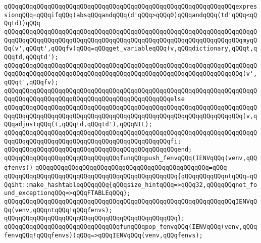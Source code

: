 \newline
\verb|qQQqqQQqqQQqqQQqqQQqqQQqqQQqqQQqqQQqqQQqqQQqqQQqqQQqqQQqqQQqqQQqexpressionqQQq=qQQqifqQQq(absqQQqandqQQq(d'qQQq>qQQq0)qQQqandqQQq(td'qQQq<qQQqtd))qQQq|\newline
\newline
\verb|qQQqqQQqqQQqqQQqqQQqqQQqqQQqqQQqqQQqqQQqqQQqqQQqqQQqqQQqqQQqqQQqqQQqqQQqqQQqqQQqqQQqqQQqqQQqqQQqqQQqqQQqqQQqqQQqqQQqqQQqqQQqqQQqqQQqqQQqmyqQQq(v',qQQqt',qQQqfv)qQQq=qQQqget_variableqQQq(v,qQQqdictionary,qQQqt,qQQqtd,qQQqtd');|\newline
\newline
\verb|qQQqqQQqqQQqqQQqqQQqqQQqqQQqqQQqqQQqqQQqqQQqqQQqqQQqqQQqqQQqqQQqqQQqqQQqqQQqqQQqqQQqqQQqqQQqqQQqqQQqqQQqqQQqqQQqqQQqqQQqqQQqqQQqqQQqqQQq(v',qQQqt',qQQqfv);|\newline
\verb|qQQqqQQqqQQqqQQqqQQqqQQqqQQqqQQqqQQqqQQqqQQqqQQqqQQqqQQqqQQqqQQqqQQqqQQqqQQqqQQqqQQqqQQqqQQqqQQqqQQqqQQqqQQqqQQqqQQqelse|\newline
\verb|qQQqqQQqqQQqqQQqqQQqqQQqqQQqqQQqqQQqqQQqqQQqqQQqqQQqqQQqqQQqqQQqqQQqqQQqqQQqqQQqqQQqqQQqqQQqqQQqqQQqqQQqqQQqqQQqqQQqqQQqqQQqqQQqqQQqqQQq(v,qQQqadjustqQQq(t,qQQqtd,qQQqtd'),qQQqNIL);|\newline
\verb|qQQqqQQqqQQqqQQqqQQqqQQqqQQqqQQqqQQqqQQqqQQqqQQqqQQqqQQqqQQqqQQqqQQqqQQqqQQqqQQqqQQqqQQqqQQqqQQqqQQqqQQqqQQqqQQqqQQqfi;|\newline
\verb|qQQqqQQqqQQqqQQqqQQqqQQqqQQqqQQqqQQqqQQqqQQqqQQqend;|\newline
\newline
\newline
\verb|qQQqqQQqqQQqqQQqqQQqqQQqqQQqqQQqfunqQQqpush_fenvqQQq(IENVqQQq(venv,qQQqfenvs))|\newline
\verb|qQQqqQQqqQQqqQQqqQQqqQQqqQQqqQQqqQQqqQQqqQQqqQQq=qQQq|\newline
\verb|qQQqqQQqqQQqqQQqqQQqqQQqqQQqqQQqqQQqqQQqqQQqqQQq{qQQqqQQqqQQqntqQQq=qQQqiht::make_hashtableqQQqqQQq{qQQqsize_hintqQQq=>qQQq32,qQQqqQQqnot_found_exceptionqQQq=>qQQqFTABLEqQQq};|\newline
\verb|qQQqqQQqqQQqqQQqqQQqqQQqqQQqqQQqqQQqqQQqqQQqqQQqqQQqqQQqqQQqqQQqIENVqQQq(venv,qQQqntqQQq!qQQqfenvs);|\newline
\verb|qQQqqQQqqQQqqQQqqQQqqQQqqQQqqQQqqQQqqQQqqQQqqQQq};|\newline
\newline
\verb|qQQqqQQqqQQqqQQqqQQqqQQqqQQqqQQqfunqQQqpop_fenvqQQq(IENVqQQq(venv,qQQqfenvqQQq!qQQqfenvs))qQQq=>qQQqIENVqQQq(venv,qQQqfenvs);|\newline
